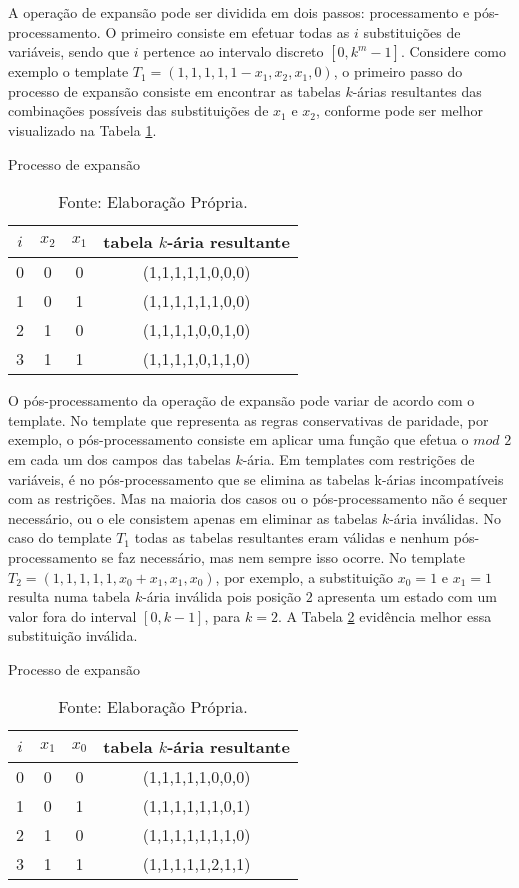 A operação de expansão pode ser dividida em dois passos: processamento e pós-processamento. O primeiro consiste em efetuar todas as $i$ substituições de variáveis, sendo que $i$ pertence ao intervalo discreto $[0,k^m-1]$. Considere como exemplo o template $T_1 = (1,1,1,1,1-x_1,x_2,x_1,0)$, o primeiro passo do processo de expansão consiste em encontrar as tabelas $k$-árias resultantes das combinações possíveis das substituições de $x_1$ e $x_2$, conforme pode ser melhor visualizado na Tabela \ref{tab:expansionProcess}.
\begin{table}[h!]
\centering
\caption{Processo de expansão}
	\begin{tabular}{cccc}
    \toprule
	$i$ & $x_2$ & $x_1$ & tabela $k$-ária resultante \\
    \midrule
	0	&	0	&	0	&	(1,1,1,1,1,0,0,0)	\\
	1	&	0	&	1	&	(1,1,1,1,1,1,0,0)	\\
	2	&	1	&	0	&	(1,1,1,1,0,0,1,0)	\\
	3	&	1	&	1	&	(1,1,1,1,0,1,1,0)	\\
    \bottomrule
	\end{tabular}
\caption*{Fonte: Elaboração Própria.}
\label{tab:expansionProcess}
\end{table}

O pós-processamento da operação de expansão pode variar de acordo com o template. No template que representa as regras conservativas de paridade, por exemplo, o pós-processamento consiste em aplicar uma função que efetua o $mod$ $2$ em cada um dos campos das tabelas $k$-ária. Em templates com restrições de variáveis, é no pós-processamento que se elimina as tabelas k-árias incompatíveis com as restrições. Mas na maioria dos casos ou o pós-processamento não é sequer necessário, ou o ele consistem apenas em eliminar as tabelas $k$-ária inválidas. No caso do template $T_1$ todas as tabelas resultantes eram válidas e nenhum pós-processamento se faz necessário, mas nem sempre isso ocorre. No template $T_2 = (1,1,1,1,1,x_0+x_1,x_1,x_0)$, por exemplo, a substituição $x_0 = 1$ e $x_1 = 1$ resulta numa tabela $k$-ária inválida pois posição $2$ apresenta um estado com um valor fora do interval $[0,k-1]$, para $k=2$. A Tabela \ref{tab:invalideExpansion} evidência melhor essa substituição inválida.
\begin{table}[h!]
\centering
\caption{Processo de expansão}
	\begin{tabular}{cccc}
    \toprule
	$i$ & $x_1$ & $x_0$ & tabela $k$-ária resultante \\
    \midrule
	0	&	0	&	0	&	(1,1,1,1,1,0,0,0)	\\
	1	&	0	&	1	&	(1,1,1,1,1,1,0,1)	\\
	2	&	1	&	0	&	(1,1,1,1,1,1,1,0)	\\
	3	&	1	&	1	&	(1,1,1,1,1,2,1,1)	\\
    \bottomrule
   	\end{tabular}
\caption*{Fonte: Elaboração Própria.}
\label{tab:invalideExpansion}
\end{table}

